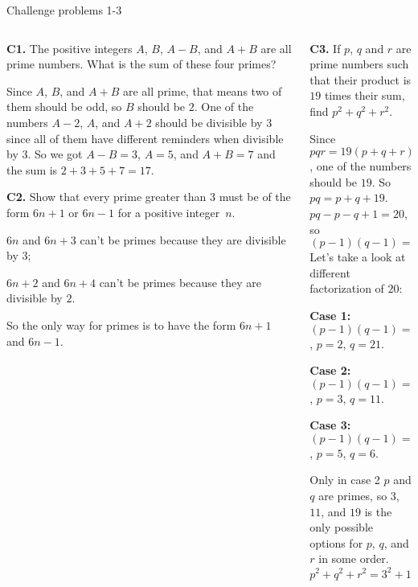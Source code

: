 \documentclass[9pt,aspectratio=169]{beamer}
\begin{document}
\begin{frame}{Challenge problems 1-3}
  \begin{columns}[T]
    \begin{column}{0.5\textwidth}
      \begin{problem}
          \textbf{C1.} The positive integers $A$, $B$, $A-B$, and $A+B$ are all prime numbers. What is the sum of these four primes?
      \end{problem}
      Since $A$, $B$, and $A + B$ are all prime, that means two of them should be odd, so $B$ should be $2$. One of the numbers $A - 2$, $A$, and $A + 2$ should be divisible by $3$ since all of them have different reminders when divisible by $3$. So we got $A - B = 3$, $A = 5$, and $A + B = 7$ and the sum is $2 + 3 + 5 + 7 = \boxed{17}$.

      \begin{problem}
        \textbf{C2.} Show that every prime greater than $3$ must be of the form $6n+1$ or $6n-1$ for a positive integer~$n$.
      \end{problem}
      $6n$ and $6n + 3$ can't be primes because they are divisible by $3$;
      
      $6n + 2$ and $6n + 4$  can't be primes because they are divisible by $2$.

      So the only way for primes is to have the form $6n+1$ and $6n-1$.
    \end{column}
    \begin{column}{0.5\textwidth}
      \begin{problem}
        \textbf{C3.} If $p$, $q$ and $r$ are prime numbers such that their product is $19$ times their sum, find $p^2 + q^2 + r^2$.
      \end{problem}
      Since $pqr = 19(p + q + r)$, one of the numbers should be $19$. So $pq = p + q + 19$. $pq - p - q + 1 = 20$, so \[(p - 1)(q - 1) = 20.\]
      Let's take a look at different factorization of $20$:

      \textbf{Case 1:} $(p - 1)(q - 1) = 1 \times 20$, $p = 2$, $q = 21$.

      \textbf{Case 2:} $(p - 1)(q - 1) = 2 \times 10$, $p = 3$, $q = 11$.

      \textbf{Case 3:} $(p - 1)(q - 1) = 4 \times 5$, $p = 5$, $q = 6$.

      Only in case 2 $p$ and $q$ are primes, so $3$, $11$, and $19$ is the only possible options for $p$, $q$, and $r$ in some order. 
      \[ p^2 + q^2 + r^2 = 3^2 + 11^2 + 19^2 = \boxed{491}.\]
    \end{column}
  \end{columns}
\end{frame}
\end{document}

